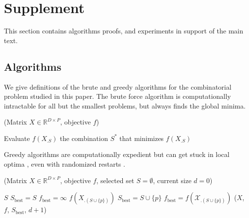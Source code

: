 \section{Supplement}

This section contains algorithms proofs, and experiments in support of the main text.

\subsection{Algorithms}
\label{sec:algorithms}

We give definitions of the brute and greedy algorithms for the combinatorial problem studied in this paper.
The brute force algorithm is computationally intractable for all but the smallest problems, but always finds the global minima.

\begin{algorithm}[H]
\caption{\brute(Matrix ${X} \in \mathbb{R}^{D \times P}$, objective $f$)}
\begin{algorithmic}[1]
    \STATE Evaluate $f({X}_{.S})$
\ENDFOR
{} the combination $S^*$ that minimizes $f({X}_{.S})$
\end{algorithmic}
\end{algorithm}

Greedy algorithms are computationally expedient but can get stuck in local optima \citep{Cormen, Russell-09}, even with randomized restarts \citep{Dick2014HowMR}.

\begin{algorithm}[H]
\caption{\greedy(Matrix ${X} \in \mathbb{R}^{D \times P}$, objective $f$, selected set $S = \emptyset$, current size $d=0$)}
\begin{algorithmic}[1]
     $S$
\ELSE
     $S_{\text{best}} = S$
     $f_{\text{best}} = \infty$
         $f({X}_{.(S \cup \{p\})})$
             $S_{\text{best}} = S \cup \{p\}$
             $f_{\text{best}} = f(\mathcal{X}_{.(S \cup \{p\})})$
        \ENDIF
    \ENDFOR
     \greedy(${X}$, $f$, $S_{\text{best}}$, $d+1$)
\ENDIF
\end{algorithmic}
\end{algorithm}

\newpage

